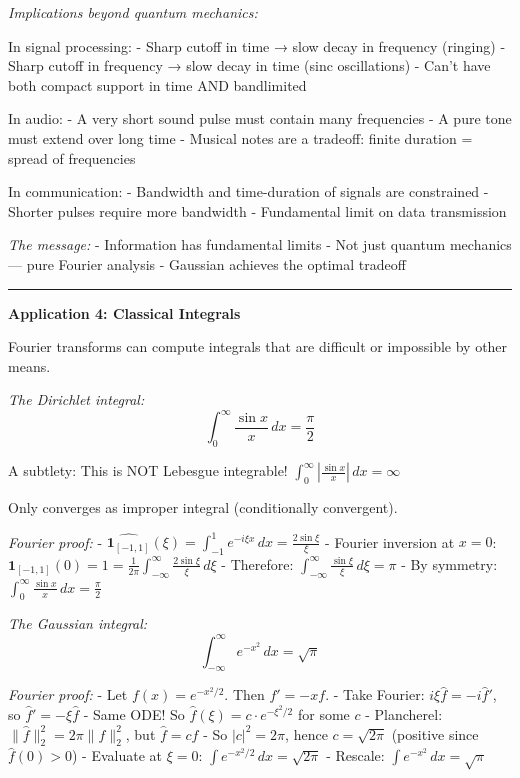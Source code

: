 \documentclass[
  10pt,
  letterpaper,
]{scrbook}
\begin{document}
\emph{Implications beyond quantum mechanics:}

In signal processing: - Sharp cutoff in time → slow decay in frequency
(ringing) - Sharp cutoff in frequency → slow decay in time (sinc
oscillations) - Can't have both compact support in time AND bandlimited

In audio: - A very short sound pulse must contain many frequencies - A
pure tone must extend over long time - Musical notes are a tradeoff:
finite duration = spread of frequencies

In communication: - Bandwidth and time-duration of signals are
constrained - Shorter pulses require more bandwidth - Fundamental limit
on data transmission

\emph{The message:} - Information has fundamental limits - Not just
quantum mechanics --- pure Fourier analysis - Gaussian achieves the
optimal tradeoff

\begin{center}\rule{0.5\linewidth}{0.5pt}\end{center}

\textbf{Application 4: Classical Integrals}

Fourier transforms can compute integrals that are difficult or
impossible by other means.

\emph{The Dirichlet integral:}
\[\int_0^\infty \frac{\sin x}{x}\, dx = \frac{\pi}{2}\]

A subtlety: This is NOT Lebesgue integrable!
\(\int_0^\infty \left|\frac{\sin x}{x}\right|\, dx = \infty\)

Only converges as improper integral (conditionally convergent).

\emph{Fourier proof:} -
\(\widehat{\mathbf{1}_{[-1,1]}}(\xi) = \int_{-1}^1 e^{-i\xi x}\, dx = \frac{2\sin\xi}{\xi}\)
- Fourier inversion at \(x = 0\):
\(\mathbf{1}_{[-1,1]}(0) = 1 = \frac{1}{2\pi}\int_{-\infty}^\infty \frac{2\sin\xi}{\xi}\, d\xi\)
- Therefore: \(\int_{-\infty}^\infty \frac{\sin\xi}{\xi}\, d\xi = \pi\)
- By symmetry: \(\int_0^\infty \frac{\sin x}{x}\, dx = \frac{\pi}{2}\)

\emph{The Gaussian integral:}
\[\int_{-\infty}^\infty e^{-x^2}\, dx = \sqrt{\pi}\]

\emph{Fourier proof:} - Let \(f(x) = e^{-x^2/2}\). Then \(f' = -xf\). -
Take Fourier: \(i\xi\hat{f} = -i\hat{f}'\), so
\(\hat{f}' = -\xi\hat{f}\) - Same ODE! So
\(\hat{f}(\xi) = c \cdot e^{-\xi^2/2}\) for some \(c\) - Plancherel:
\(\|\hat{f}\|_2^2 = 2\pi\|f\|_2^2\), but \(\hat{f} = cf\) - So
\(|c|^2 = 2\pi\), hence \(c = \sqrt{2\pi}\) (positive since
\(\hat{f}(0) > 0\)) - Evaluate at \(\xi = 0\):
\(\int e^{-x^2/2}\, dx = \sqrt{2\pi}\) - Rescale:
\(\int e^{-x^2}\, dx = \sqrt{\pi}\)
\end{document}
